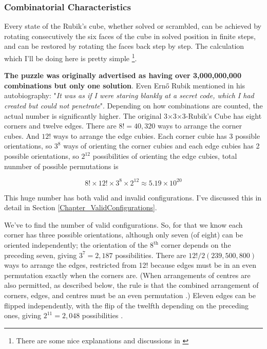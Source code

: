 \documentclass[12pt,a4paper]{article}
\theoremstyle{custom}
\newcommand{\Tthree}{3$\times$3$\times$3-}
\begin{document}
\subsubsection{Combinatorial Characteristics}
Every state of the Rubik’s cube, whether solved or scrambled, can be achieved by rotating consecutively the six faces of the cube in solved position in finite steps, and can be restored by rotating the faces back step by step. The calculation which I'll be doing here is pretty simple \footnote{There are some nice explanations and discussions in \cite{hoda2010finding, animesh2018calculating, JC, 2018ChJME..31...77Z}}. 


\textbf{The puzzle was originally advertised as having over 3,000,000,000 combinations but only one solution}. Even Ern\H{o} Rubik mentioned in his autobiography: "\textit{It was as if I were staring blankly at a secret code, which I had created but could not penetrate}".
Depending on how combinations are counted, the actual number is significantly higher.
The original \Tthree Rubik's Cube has eight corners and twelve edges. There are $8!= 40,320$ ways to arrange the corner cubes. 
And $12!$ ways to arrange the edge cubies. Each corner cubie has 3 possible orientations, so $3^8$ ways of orienting the corner cubies and each edge cubies has 2 possible orientations, so $2^{12}$ possibilities of orienting the edge cubies, total nunmber of possible permutations  is

$$\boxed{8! \times 12!\times 3^8 \times 2^{12} \approx 5.19 \times 10^{20}}$$

This huge number has both valid and invalid configurations. I've discussed this in detail in Section \ref{Chapter_ValidConfigurations}. 

We've to find the number of valid configurations. 
So, for that we know each corner has three possible orientations, although only seven (of eight) can be oriented independently; the orientation of the $8^\text{th}$ corner depends on the preceding seven, giving $3^{7}= 2,187$ possibilities.
There are $12!/2 (239,500,800)$ ways to arrange the edges, restricted from 12! because edges must be in an even permutation exactly when the corners are. (When arrangements of centres are also permitted, as described below, the rule is that the combined arrangement of corners, edges, and centres must be an even permutation \cite{Hu}.) Eleven edges can be flipped independently, with the flip of the twelfth depending on the preceding ones, giving $2^{11}= 2,048$ possibilities \cite{wong2010group}.\\
\end{document}

